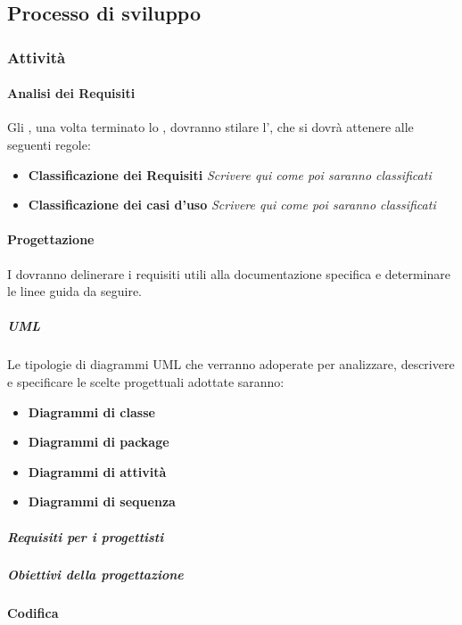 \subsection{Processo di sviluppo}
\subsubsection{Attività}
\paragraph{Analisi dei Requisiti}
	Gli \anas, una volta terminato lo \SdF, dovranno stilare l'\AdR, che si dovrà attenere alle seguenti regole:
	\begin{itemize}
	\item \textbf{Classificazione dei Requisiti}
	\textit{Scrivere qui come poi saranno classificati}
	\item \textbf{Classificazione dei casi d'uso}
	\textit{Scrivere qui come poi saranno classificati}
	\end{itemize}
\paragraph{Progettazione}
	I \progs dovranno delinerare i requisiti utili alla documentazione specifica e determinare le linee guida da seguire.
	\subparagraph{UML}
	Le tipologie di diagrammi UML che verranno adoperate per analizzare, descrivere e specificare le scelte progettuali adottate saranno:
	\begin{itemize}
		\item \textbf{Diagrammi di classe}
		\item \textbf{Diagrammi di package}
		\item \textbf{Diagrammi di attività}
		\item \textbf{Diagrammi di sequenza}
	\end{itemize}
	\subparagraph{Requisiti per i progettisti}
	
	\subparagraph{Obiettivi della progettazione}
	\subparagraph{}
	\paragraph{Codifica}

